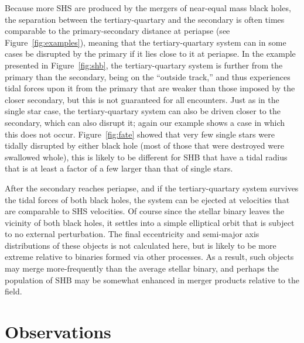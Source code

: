 \documentclass[a4paper,twocolumn]{emulateapj}
\begin{document}
{Because more SHS are produced by the mergers of near-equal mass black holes, the separation between the tertiary-quartary and the secondary is often times comparable to the primary-secondary distance at periapse (see Figure~\ref{fig:examples}), meaning that the tertiary-quartary system can in some cases be disrupted by the primary if it lies close to it at periapse. In the example presented in Figure~\ref{fig:shb}, the tertiary-quartary system is further from the primary than the secondary, being on the ``outside track,'' and thus experiences tidal forces upon it from the primary that are weaker than those imposed by the closer secondary, but this is not guaranteed for all encounters. Just as in the single star case, the tertiary-quartary system can also be driven closer to the secondary, which can also disrupt it; again our example shows a case in which this does not occur. Figure~\ref{fig:fate} showed that very few single stars were tidally disrupted by either black hole (most of those that were destroyed were swallowed whole), this is likely to be different for SHB that have a tidal radius that is at least a factor of a few larger than that of single stars.

After the secondary reaches periapse, and if the tertiary-quartary system survives the tidal forces of both black holes, the system can be ejected at velocities that are comparable to SHS velocities. Of course since the stellar binary leaves the vicinity of both black holes, it settles into a simple elliptical orbit that is subject to no external perturbation. The final eccentricity and semi-major axis distributions of these objects is not calculated here, but is likely to be more extreme relative to binaries formed via other processes. As a result, such objects may merge more-frequently than the average stellar binary, and perhaps the population of SHB may be somewhat enhanced in merger products relative to the field.

\section{Observations}\label{sec:observations}

}
\end{document}
